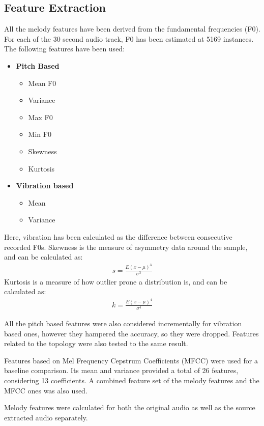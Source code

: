 \documentclass[12pt,journal,compsoc]{IEEEtran}
\begin{document}
\subsection{Feature Extraction}
\label{sec:features}
All the melody features have been derived from the fundamental frequencies (F0). For each of the 30 second audio track, F0 has been estimated at 5169 instances. The following features have been used:
\begin{itemize}
\item \textbf{Pitch Based}
		\begin{itemize}
		\item Mean F0
		\item Variance
		\item Max F0
		\item Min F0
		\item Skewness
		\item Kurtosis
		\end{itemize}
\item \textbf{Vibration based}
		\begin{itemize}
		\item Mean
		\item Variance
		\end{itemize}
\end{itemize}

Here, vibration has been calculated as the difference between consecutive recorded F0s.
Skewness is the measure of asymmetry data around the sample, and can be calculated as:
\begin{align}
s = \frac{E(x - \mu)^3}{\sigma^3}
\end{align}
Kurtosis is a measure of how outlier prone a distribution is, and can be calculated as:
\begin{align}
k = \frac{E(x - \mu)^4}{\sigma^4}
\end{align}

All the pitch based features were also considered incrementally for vibration based ones, however they hampered the accuracy, so they were dropped. Features related to the topology were also tested to the same result.

Features based on Mel Frequency Cepstrum Coefficients (MFCC) were used for a baseline comparison. Its mean and variance provided a total of 26 features, considering 13 coefficients. A combined feature set of the melody features and the MFCC ones was also used.

Melody features were calculated for both the original audio as well as the source extracted audio separately.
\end{document}
